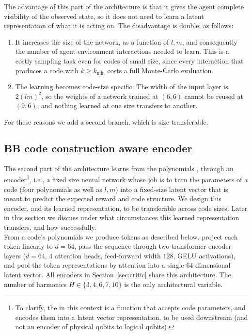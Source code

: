 \noindent The advantage of this part of the architecture is that it gives the agent complete visibility of the observed state, so it
does not need to learn a latent representation of what it is acting on. 
The disadvantage is double, as follows:
\begin{enumerate}
  \item It increases the size of the network, as a function of \(l,m\), and consequently the number of agent-environment
  interactions needed to learn. This is a costly sampling task even for codes of small size, since
  every interaction that produces a code with \(k \geq k_{\min}\) costs a full Monte-Carlo evaluation.
  \item The learning becomes code-size specific. The width of the input layer is \(2{(lm)}^{2}\), so the
  weights of a network trained at \((6,6)\) cannot be reused at \((9,6)\), and nothing learned at one
  size transfers to another.
\end{enumerate}
For these reasons we add a second branch, which is size transferable.

\subsection{BB code construction aware encoder\label{sec:encoderBranch}}
The second part of the architecture learns from the polynomials \polynomials{}, 
through an encoder\footnote{To clarify, the  in this context is a function that accepts code
parameters, and encodes them into a latent vector representation, to be used downstream (and not an
encoder of physical qubits to logical qubits).}, i.e., a fixed size neural network whose job is to turn the
parameters of a code (four polynomials as well as \(l,m\)) into a fixed-size latent vector that
is meant to predict the expected reward and code structure.
We design this encoder, and its learned representation, to be transferable across code sizes.
Later in this section we discuss under what circumstances this learned representation transfers, and how successfully.\\
      
 \noindent From a code's polynomials we produce tokens as described below, project each token
linearly to \(d=64\), pass the sequence through two transformer encoder layers
(\(d=64\), \(4\) attention heads, feed-forward width \(128\), GELU activations), and
pool the token representations by attention into a single \(64\)-dimensional latent
vector. 
All encoders in Section~\ref{sec:critic} share this architecture.
The number of harmonics \(H \in \{3,4,6,7,10\}\) is the only architectural variable.
    
